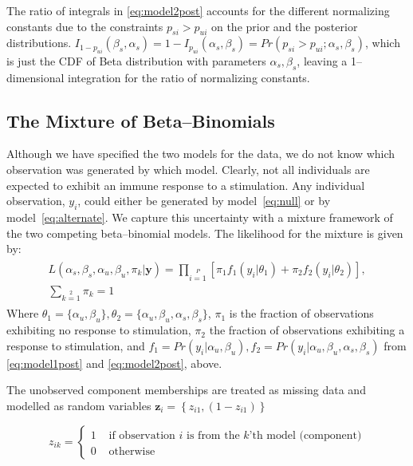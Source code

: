 \documentclass[11pt]{article}
\begin{document}
The ratio of integrals in \eqref{eq:model2post} accounts for the different normalizing constants due to the constraints $p_{si}>p_{ui}$ on the prior and the posterior distributions. $I_{1-p_{ui}}(\beta_s,\alpha_s)=1-I_{p_{ui}}(\alpha_s,\beta_s)=Pr(p_{si} > p_{ui}; \alpha_s,\beta_s)$, which is just the CDF of Beta distribution with parameters $\alpha_s,\beta_s$, leaving a 1--dimensional integration for the ratio of normalizing constants.

\subsection{The Mixture of Beta--Binomials}
Although we have specified the two models for the data, we do not know which observation was generated by which model. Clearly, not all individuals are expected to exhibit an immune response to a stimulation. Any individual observation, $y_i$, could either be generated by model~\eqref{eq:null} or by model~\eqref{eq:alternate}. We capture this uncertainty with a mixture framework of the two competing beta--binomial models. The likelihood for the mixture is given by:
\begin{align}
\begin{split}
L(\alpha_s,\beta_s,\alpha_u,\beta_u,\pi_k|\mathbf{y})=\prod\limits_{i=1}\limits^P\left[ \pi_1 f_1(y_i|\theta_1) +\pi_2 f_2(y_i|\theta_2) \right] ,\\ \sum\limits_{k=1}\limits^2\pi_k=1
\end{split}
\end{align}
Where $\theta_1=\{\alpha_u,\beta_u\}, \theta_2=\{\alpha_u,\beta_u,\alpha_s,\beta_s\}$, $\pi_1$ is the fraction of observations exhibiting no response to stimulation, $\pi_2$ the fraction of observations exhibiting a response to stimulation, and $f_1 = Pr(y_i|\alpha_u,\beta_u), f_2 = Pr(y_i|\alpha_u,\beta_u,\alpha_s,\beta_s)$ from \eqref{eq:model1post} and \eqref{eq:model2post}, above. 

The unobserved component memberships are treated as missing data and modelled as random variables  $\mathbf{z}_i = \left\{z_{i1},(1-z_{i1})\right\}$

$$
z_{ik} = \left\{ \begin{array}{rl}
1 &\mbox{ if observation $i$ is from the $k$'th model (component)} \\
0&\mbox{ otherwise}
\end{array} \right.
$$
\end{document}
